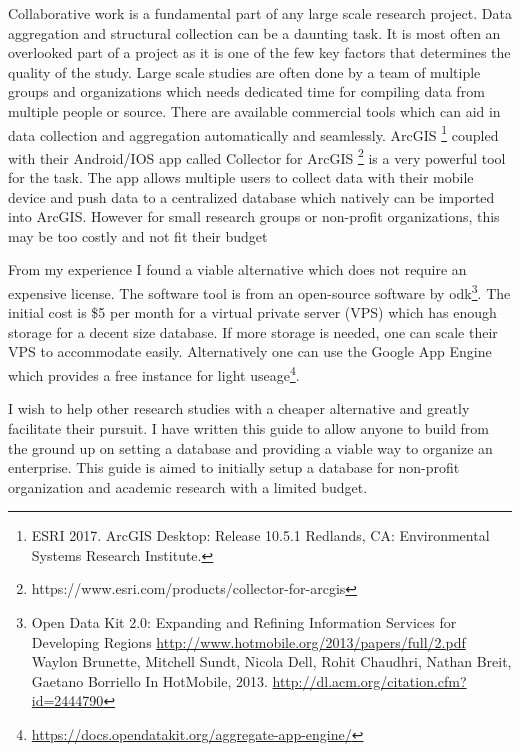 

Collaborative work is a fundamental part of any large scale research project. Data aggregation and structural collection can be a daunting task. It is most often an overlooked part of a project as it is one of the few key factors that determines the quality of the study. Large scale studies are often done by a team of multiple groups and organizations which needs dedicated time for compiling data from multiple people or source. There are available commercial tools which can aid in data collection and aggregation automatically and seamlessly. ArcGIS \footnote{ESRI 2017. ArcGIS Desktop: Release 10.5.1 Redlands, CA: Environmental Systems Research Institute.} coupled with their Android/IOS app called Collector for ArcGIS \footnote{https://www.esri.com/products/collector-for-arcgis} is a very powerful tool for the task. The app allows multiple users to collect data with their mobile device and push data to a centralized database which natively can be imported into ArcGIS. However for small research groups or non-profit organizations, this may be too costly and not fit their budget

From my experience I found a viable alternative which does not require an expensive license.  The software tool is from an open-source software by \gls{odk}\footnote{Open Data Kit 2.0: Expanding and Refining Information Services for Developing Regions \url{http://www.hotmobile.org/2013/papers/full/2.pdf} Waylon Brunette, Mitchell Sundt, Nicola Dell, Rohit Chaudhri, Nathan Breit, Gaetano Borriello In HotMobile, 2013. \url{http://dl.acm.org/citation.cfm?id=2444790}}.  The initial cost is \$5 per month for a virtual private server (VPS) which has enough storage for a decent size database. If more storage is needed, one can scale their VPS to accommodate easily. Alternatively one can use the Google App Engine which provides a free instance for light useage\footnote{\url{https://docs.opendatakit.org/aggregate-app-engine/}}.

I wish to help other research studies with a cheaper alternative and greatly facilitate their pursuit. I have written this guide to allow anyone to build from the ground up on setting a database and providing a viable way to organize an enterprise. This guide is aimed to initially setup a database for non-profit organization and academic research with a limited budget.

